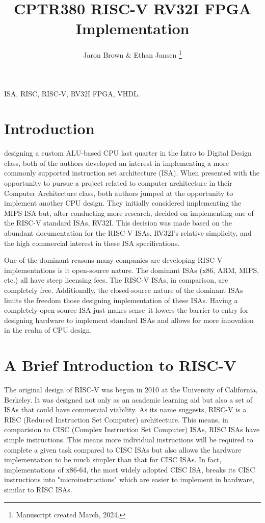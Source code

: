 \documentclass[lettersize,journal]{IEEEtran}
\begin{document}
\title{CPTR380 RISC-V RV32I FPGA Implementation}
\author{Jaron Brown \& Ethan Jansen
\thanks{Manuscript created March, 2024.}}

\maketitle

\begin{abstract}
\color{red}{TBD}
\end{abstract}

\begin{IEEEkeywords}
ISA, RISC, RISC-V, RV32I FPGA, VHDL.
\end{IEEEkeywords}


\section{Introduction}
 designing a custom ALU-based CPU last quarter in the Intro to Digital Design class, 
both of the authors developed an interest in implementing a more commonly supported instruction set architecture (ISA). 
When presented with the opportunity to pursue a project related to computer architecture in their Computer Architecture class, 
both authors jumped at the opportunity to implement another CPU design. They initially considered implementing the MIPS ISA but, 
after conducting more research, decided on implementing one of the RISC-V standard ISAs, RV32I. This decision was made based on the abundant 
documentation for the RISC-V ISAs, RV32I's relative simplicity, and the high commercial interest in these ISA specifications.

One of the dominant reasons many companies are developing RISC-V implementations is it open-source nature. 
The dominant ISAs (x86, ARM, MIPS, etc.) all have steep licensing fees. The RISC-V ISAs, in comparison, are completely free. 
Additionally, the closed-source nature of the dominant ISAs limits the freedom those designing implementation of these ISAs. 
Having a completely open-source ISA just makes sense--it lowers the barrier to entry for designing hardware to implement standard 
ISAs and allows for more innovation in the realm of CPU design.  

\section{A Brief Introduction to RISC-V}
The original design of RISC-V was begun in 2010 at the University of California, Berkeley. 
It was designed not only as an academic learning aid but also a set of ISAs that could have commercial viability. 
As its name suggests, RISC-V is a RISC (Reduced Instruction Set Computer) architecture. 
This means, in comparision to CISC (Complex Instruction Set Computer) ISAs, RISC ISAs have simple instructions. 
This means more individual instructions will be required to complete a given task compared to CISC ISAs but also allows the 
hardware implementation to be much simpler than that for CISC ISAs. In fact, implementations of x86-64, the most widely adopted CISC ISA, 
breaks its CISC instructions into "microinstructions" which are easier to implement in hardware, similar to RISC ISAs.
\end{document}
